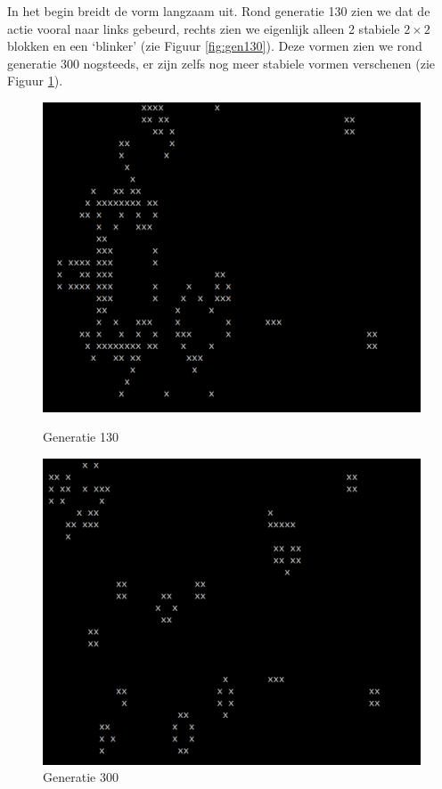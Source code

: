 \documentclass[10pt]{article}
\begin{document}
In het begin breidt de vorm langzaam uit. Rond generatie 130 zien we dat de actie vooral naar links gebeurd, rechts zien we eigenlijk alleen 2 stabiele $2\times2$ blokken en een `blinker' (zie Figuur \ref{fig:gen130}). Deze vormen zien we rond generatie 300 nogsteeds, er zijn zelfs nog meer stabiele vormen verschenen (zie Figuur \ref{fig:gen300}).

\begin{figure}[!ht]
\begin{center}

\begin{minipage}{.5\textwidth}
\includegraphics[width=0.75\linewidth]{gen130.png}
\caption{Generatie 130}\label{fig:gen130}
\end{minipage}%
\begin{minipage}{.5\textwidth}
\includegraphics[width=0.75\linewidth]{gen300.png}
\caption{Generatie 300}\label{fig:gen300}
\end{minipage}

\end{center}
\end{figure}
\end{document}
